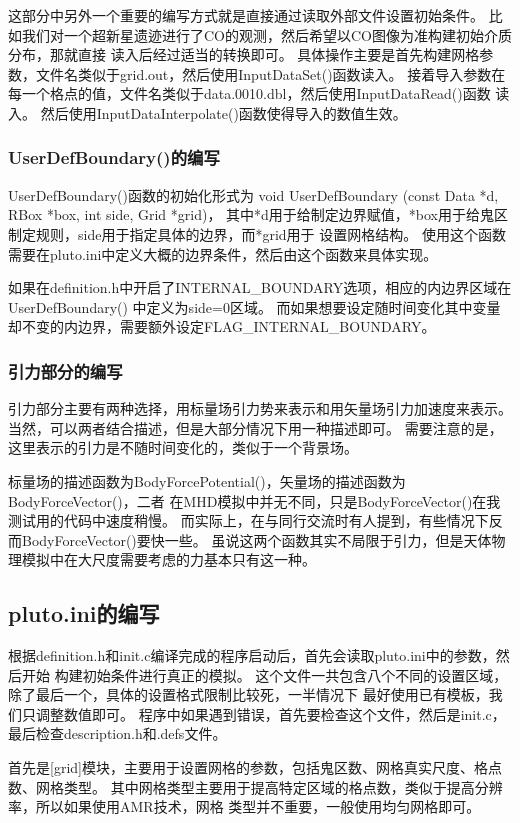 这部分中另外一个重要的编写方式就是直接通过读取外部文件设置初始条件。
比如我们对一个超新星遗迹进行了CO的观测，然后希望以CO图像为准构建初始介质分布，那就直接
读入后经过适当的转换即可。
具体操作主要是首先构建网格参数，文件名类似于grid.out，然后使用InputDataSet()函数读入。
接着导入参数在每一个格点的值，文件名类似于data.0010.dbl，然后使用InputDataRead()函数
读入。
然后使用InputDataInterpolate()函数使得导入的数值生效。

\subsubsection{UserDefBoundary()的编写}
UserDefBoundary()函数的初始化形式为
void UserDefBoundary (const Data *d, RBox *box, int side, Grid *grid)，
其中*d用于给制定边界赋值，*box用于给鬼区制定规则，side用于指定具体的边界，而*grid用于
设置网格结构。
使用这个函数需要在pluto.ini中定义大概的边界条件，然后由这个函数来具体实现。

如果在definition.h中开启了INTERNAL\_BOUNDARY选项，相应的内边界区域在UserDefBoundary()
中定义为side=0区域。
而如果想要设定随时间变化其中变量却不变的内边界，需要额外设定FLAG\_INTERNAL\_BOUNDARY。

\subsubsection{引力部分的编写}
引力部分主要有两种选择，用标量场引力势来表示和用矢量场引力加速度来表示。
当然，可以两者结合描述，但是大部分情况下用一种描述即可。
需要注意的是，这里表示的引力是不随时间变化的，类似于一个背景场。

标量场的描述函数为BodyForcePotential()，矢量场的描述函数为BodyForceVector()，二者
在MHD模拟中并无不同，只是BodyForceVector()在我测试用的代码中速度稍慢。
而实际上，在与同行交流时有人提到，有些情况下反而BodyForceVector()要快一些。
虽说这两个函数其实不局限于引力，但是天体物理模拟中在大尺度需要考虑的力基本只有这一种。

\subsection{pluto.ini的编写}
根据definition.h和init.c编译完成的程序启动后，首先会读取pluto.ini中的参数，然后开始
构建初始条件进行真正的模拟。
这个文件一共包含八个不同的设置区域，除了最后一个，具体的设置格式限制比较死，一半情况下
最好使用已有模板，我们只调整数值即可。
程序中如果遇到错误，首先要检查这个文件，然后是init.c，最后检查description.h和.defs文件。

首先是[grid]模块，主要用于设置网格的参数，包括鬼区数、网格真实尺度、格点数、网格类型。
其中网格类型主要用于提高特定区域的格点数，类似于提高分辨率，所以如果使用AMR技术，网格
类型并不重要，一般使用均匀网格即可。

